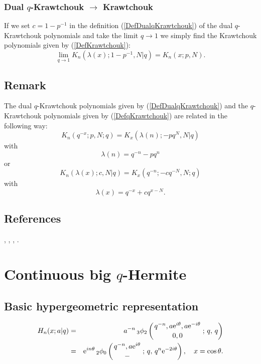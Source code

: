 \documentclass[envcountchap,graybox]{svmono}
\newcommand{\qhyp}[5]{\mbox{}_{#1}{\phi}_{#2}
\left(\genfrac{}{}{0pt}{}{#3}{#4}\,;\,q,\,#5\right)}
\newcommand{\e}{\textrm{e}}
\begin{document}
\subsubsection*{Dual $q$-Krawtchouk $\rightarrow$ Krawtchouk}
If we set $c=1-p^{-1}$ in the definition (\ref{DefDualqKrawtchouk}) of the
dual $q$-Krawtchouk polynomials and take the limit $q\rightarrow 1$ we simply find
the Krawtchouk polynomials given by (\ref{DefKrawtchouk}):
\begin{equation}
\lim_{q\rightarrow 1}K_n(\lambda(x);1-p^{-1},N|q)=K_n(x;p,N).
\end{equation}

\subsection*{Remark}
The dual $q$-Krawtchouk polynomials given by (\ref{DefDualqKrawtchouk})
and the $q$-Krawtchouk polynomials given by (\ref{DefqKrawtchouk}) are
related in the following way:
$$K_n(q^{-x};p,N;q)=K_x(\lambda(n);-pq^N,N|q)$$
with
$$\lambda(n)=q^{-n}-pq^n$$
or
$$K_n(\lambda(x);c,N|q)=K_x(q^{-n};-cq^{-N},N;q)$$
with
$$\lambda(x)=q^{-x}+cq^{x-N}.$$

\subsection*{References}
\cite{LChiharaStanton}, \cite{Koelink96I}, \cite{Koorn90II}, \cite{Koorn93}.


\section{Continuous big $q$-Hermite}
\par\setcounter{equation}{0}

\subsection*{Basic hypergeometric representation}
\begin{eqnarray}
\label{DefContBigqHermite}
H_n(x;a|q)&=&a^{-n}\,\qhyp{3}{2}{q^{-n},a\e^{i\theta},a\e^{-i\theta}}{0,0}{q}\\
&=&\e^{in\theta}\,\qhyp{2}{0}{q^{-n},a\e^{i\theta}}{-}{q^n\e^{-2i\theta}},
\quad x=\cos\theta.\nonumber
\end{eqnarray}
\end{document}
